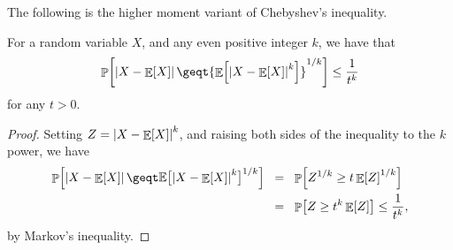The following is the higher
moment variant of Chebyshev's inequality.
\begin{lemma}
    For a random variable $X$, and any even positive integer $k$, we have that
    \begin{equation*}
        \ds%
        \Prob{\cardin{X - \Ex{X}}
           \geq%
           t {\Ex{ \bigl. {\cardin{X -  \Ex{X}}}^k} }^{1/k}}  
        \leq
        \frac{1}{t^k}
    \end{equation*}
    for any $t > 0$.
\end{lemma}
\begin{proof}
    Setting $Z = \left| {X - \mathop{\mathbb{E}}\!\left[ {X} \right]} \right|^k$, and 
    raising both sides of the inequality to the $k$\th power, we have
    \begin{align*}
        \Prob{\cardin{X - \Ex{X}}
           \geq%
           t \ExChar \bigl[ \cardin{X - \Ex{X}}^k \bigr]^{1/k} } %
        &
        \EQ %
      \Prob{Z^{1/k} \geq t \Ex{ Z }^{1/k}}
      \\&
      \EQ%
      \Prob{Z \geq t^k \Ex{Z}}%
      \leq%
      \frac{1}{t^k},
    \end{align*}
    by Markov's inequality.
\end{proof}

